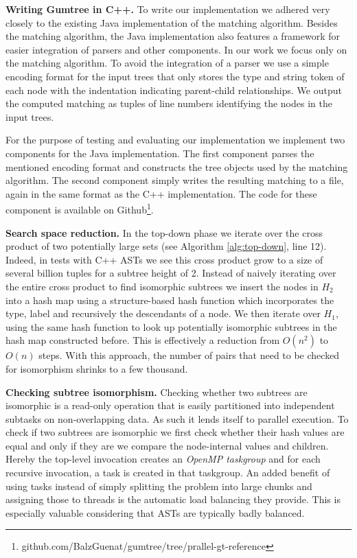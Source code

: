 \documentclass[letterpaper]{article}
\newcommand{\mypar}[1]{{\bf #1.}}
\begin{document}
\mypar{Writing Gumtree in C++}
To write our implementation we adhered very closely to the existing Java implementation of the matching algorithm.
Besides the matching algorithm, the Java implementation also features a framework for easier integration of parsers and other components.
In our work we focus only on the matching algorithm.
To avoid the integration of a parser we use a simple encoding format for the input trees that only stores the type and string token of each node with the indentation indicating parent-child relationships.
We output the computed matching as tuples of line numbers identifying the nodes in the input trees.

For the purpose of testing and evaluating our implementation we implement two components for the Java implementation.
The first component parses the mentioned encoding format and constructs the tree objects used by the matching algorithm.
The second component simply writes the resulting matching to a file, again in the same format as the C++ implementation.
The code for these component is available on Github\footnote{github.com/BalzGuenat/gumtree/tree/prallel-gt-reference}.

\mypar{Search space reduction}
In the top-down phase we iterate over the cross product of two potentially large sets (see Algorithm \ref{alg:top-down}, line 12).
Indeed, in tests with C++ ASTs we see this cross product grow to a size of several billion tuples for a subtree height of 2.
Instead of naively iterating over the entire cross product to find isomorphic subtrees we insert the nodes in $H_2$ into a hash map using a structure-based hash function which incorporates the type, label and recursively the descendants of a node.
We then iterate over $H_1$, using the same hash function to look up potentially isomorphic subtrees in the hash map constructed before.
This is effectively a reduction from $O(n^2)$ to $O(n)$ steps.
With this approach, the number of pairs that need to be checked for isomorphism shrinks to a few thousand.

\mypar{Checking subtree isomorphism} %
Checking whether two subtrees are isomorphic is a read-only operation that is easily partitioned into independent subtasks on non-overlapping data.
As such it lends itself to parallel execution.
To check if two subtrees are isomorphic we first check whether their hash values are equal and only if they are we compare the node-internal values and children.
Hereby the top-level invocation creates an \emph{OpenMP taskgroup} and for each recursive invocation, a task is created in that taskgroup.
An added benefit of using tasks instead of simply splitting the problem into large chunks and assigning those to threads is the automatic load balancing they provide.
This is especially valuable considering that ASTs are typically badly balanced.
\end{document}
